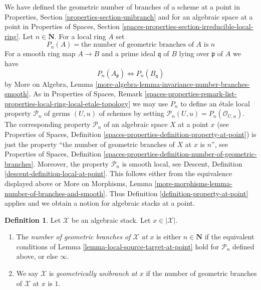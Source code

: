 \documentclass{stacks-project}
\theoremstyle{plain}
\theoremstyle{definition}
\newtheorem{definition}[subsection]{Definition}
\theoremstyle{remark}
\numberwithin{equation}{subsection}
\begin{document}
\noindent
We have defined the geometric number of branches of a scheme at a point
in Properties, Section \ref{properties-section-unibranch}
and for an algebraic space at a point in Properties of Spaces, Section
\ref{spaces-properties-section-irreducible-local-ring}.
Let $n \in \mathbf{N}$. For a local ring $A$ set
$$
P_n(A) = \text{the number of geometric branches of }A\text{ is }n
$$
For a smooth ring map $A \to B$ and a prime ideal $\mathfrak q$
of $B$ lying over $\mathfrak p$ of $A$ we have
$$
P_n(A_\mathfrak p) \Leftrightarrow P_n(B_\mathfrak q)
$$
by More on Algebra, Lemma
\ref{more-algebra-lemma-invariance-number-branches-smooth}.
As in Properties of Spaces, Remark
\ref{spaces-properties-remark-list-properties-local-ring-local-etale-topology}
we may use $P_n$ to define an \'etale local property $\mathcal{P}_n$
of germs $(U, u)$ of schemes by setting
$\mathcal{P}_n(U, u) = P_n(\mathcal{O}_{U, u})$.
The corresponding property $\mathcal{P}_n$
of an algebraic space $X$ at a point $x$
(see Properties of Spaces, Definition
\ref{spaces-properties-definition-property-at-point})
is just the property
``the number of geometric branches of $X$ at $x$ is $n$'', see
Properties of Spaces, Definition
\ref{spaces-properties-definition-number-of-geometric-branches}.
Moreover, the property $\mathcal{P}_n$ is smooth local, see
Descent, Definition \ref{descent-definition-local-at-point}.
This follows either from the equivalence displayed above
or More on Morphisms, Lemma
\ref{more-morphisms-lemma-number-of-branches-and-smooth}.
Thus Definition \ref{definition-property-at-point}
applies and we obtain a notion for algebraic stacks at a point.

\begin{definition}
\label{definition-number-of-geometric-branches}
Let $\mathcal{X}$ be an algebraic stack. Let $x \in |\mathcal{X}|$.
\begin{enumerate}
\item The {\it number of geometric branches of $\mathcal{X}$ at $x$}
is either $n \in \mathbf{N}$ if the equivalent conditions of
Lemma \ref{lemma-local-source-target-at-point} hold for
$\mathcal{P}_n$ defined above, or else $\infty$.
\item We say $\mathcal{X}$ is {\it geometrically unibranch at $x$}
if the number of geometric branches of $\mathcal{X}$ at $x$ is $1$.
\end{enumerate}
\end{definition}
\end{document}
